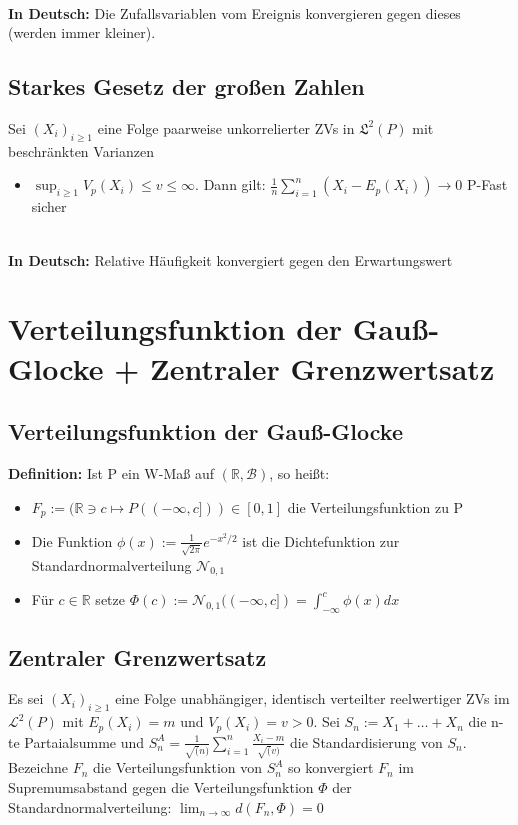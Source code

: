 \documentclass[a4paper,11pt]{scrartcl}
\begin{document}
\textbf{\\In Deutsch:}
Die Zufallsvariablen vom Ereignis konvergieren gegen dieses (werden immer kleiner).

\subsection{Starkes Gesetz der großen Zahlen}
Sei $(X_i)_{i \geq 1}$ eine Folge paarweise unkorrelierter ZVs in $\mathfrak{L}^2(P)$ mit beschränkten Varianzen
\begin{itemize}
    \item 
    $\sup_{i \geq 1} V_p(X_i) \leq v \leq \infty$. Dann gilt: $\frac{1}{n} \sum_{i = 1}^n (X_i -E_p(X_i))  \rightarrow 0$ P-Fast sicher
\end{itemize}

\textbf{\\In Deutsch:}
Relative Häufigkeit konvergiert gegen den Erwartungswert

\section{Verteilungsfunktion der Gauß-Glocke + Zentraler Grenzwertsatz}
\subsection{Verteilungsfunktion der Gauß-Glocke}
\textbf{Definition:}
Ist P ein W-Maß auf $(\mathbb{R},\mathcal{B})$, so heißt: 
\begin{itemize}
    \item $F_p:= (\mathbb{R} \ni c \mapsto P((-\infty,c])) \in [0,1]$ die Verteilungsfunktion zu P
    \item Die Funktion $\phi (x) := \frac{1}{\sqrt{2 \pi}} e^{-x^2/2}$ ist die Dichtefunktion zur Standardnormalverteilung $\mathcal{N}_{0,1}$
    \item Für $c \in \mathbb{R}$ setze $\Phi (c) := \mathcal{N}_{0,1}((-\infty,c]) = \int_{-\infty}^c \phi (x)dx$
\end{itemize}

\subsection{Zentraler Grenzwertsatz}
Es sei $(X_i)_{i \geq 1}$ eine Folge unabhängiger, identisch verteilter reelwertiger ZVs im $\mathcal{L}^2 (P)$ mit $E_p(X_i) = m$ und $V_p(X_i)= v > 0$.
Sei $S_n := X_1 + \dots + X_n$ die n-te Partaialsumme und $S_n^A = \frac{1}{\sqrt(n)} \sum_{i =1}^n \frac{X_i-m}{\sqrt(v)}$ die Standardisierung von $S_n$. 
Bezeichne $F_n$ die Verteilungsfunktion von $S_n^A$ so konvergiert $F_n$ im Supremumsabstand gegen die Verteilungsfunktion $\Phi$ der Standardnormalverteilung: $\lim_{n \rightarrow \infty} d(F_n,\Phi) = 0$
\end{document}
